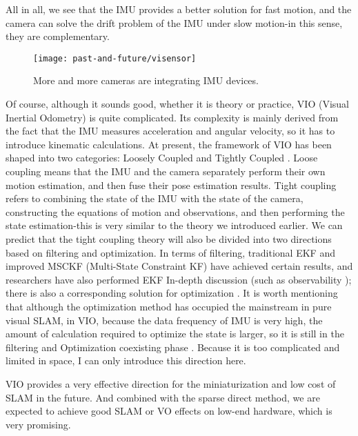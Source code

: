 All in all, we see that the IMU provides a better solution for fast motion, and the camera can solve the drift problem of the IMU under slow motion-in this sense, they are complementary.

\begin{figure}[! thp]
\centering
\texttt{[image: past-and-future/visensor]}
\caption{More and more cameras are integrating IMU devices. }
\label{fig: visensor}
\end{figure}

Of course, although it sounds good, whether it is theory or practice, VIO (Visual Inertial Odometry) is quite complicated. Its complexity is mainly derived from the fact that the IMU measures acceleration and angular velocity, so it has to introduce kinematic calculations. At present, the framework of VIO has been shaped into two categories: Loosely Coupled and Tightly Coupled \textsuperscript{\cite{Martinelli2014}}. Loose coupling means that the IMU and the camera separately perform their own motion estimation, and then fuse their pose estimation results. Tight coupling refers to combining the state of the IMU with the state of the camera, constructing the equations of motion and observations, and then performing the state estimation-this is very similar to the theory we introduced earlier. We can predict that the tight coupling theory will also be divided into two directions based on filtering and optimization. In terms of filtering, traditional EKF \textsuperscript{\cite{Bloesch2015}} and improved MSCKF (Multi-State Constraint KF) \textsuperscript{\cite{Li2013}} have achieved certain results, and researchers have also performed EKF In-depth discussion (such as observability \textsuperscript{\cite{Huang2014}}); there is also a corresponding solution for optimization \textsuperscript{\cite{Leutenegger2015, Forster2015}}. It is worth mentioning that although the optimization method has occupied the mainstream in pure visual SLAM, in VIO, because the data frequency of IMU is very high, the amount of calculation required to optimize the state is larger, so it is still in the filtering and Optimization coexisting phase \textsuperscript{\cite{Tkocz2015, Usenko2016}}. Because it is too complicated and limited in space, I can only introduce this direction here.

VIO provides a very effective direction for the miniaturization and low cost of SLAM in the future. And combined with the sparse direct method, we are expected to achieve good SLAM or VO effects on low-end hardware, which is very promising.


